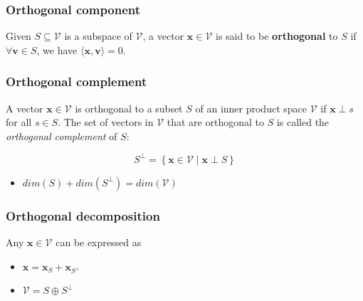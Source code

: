 \documentclass{article}
\begin{document}
        \subsubsection{Orthogonal component}
        \begin{definition}
            Given \( S \subseteq \mathcal{V} \) is a subspace of \( \mathcal{V} \), a vector \( \mathbf{x} \in \mathcal{V} \) is said to be \textbf{orthogonal} to \( S \) if \( \forall \mathbf{v} \in S \), we have \( \langle \mathbf{x}, \mathbf{v} \rangle = 0 \).
        \end{definition}

        \subsubsection{Orthogonal complement}
        \begin{definition}
            A vector $\mathbf{x} \in \mathcal{V}$ is orthogonal to a subset $S$ of an inner product space $\mathcal{V}$ if $\mathbf{x} \perp s$ for all $s \in S$. The set of vectors in $\mathcal{V}$ that are orthogonal to $S$ is called the \textit{orthogonal complement} of $S$:

            \begin{equation}
                S^\perp = \left\{ \mathbf{x} \in \mathcal{V} \mid \mathbf{x} \perp S \right\}
            \end{equation}
            \begin{itemize}
                \item $dim(S) + dim(S^\perp) = dim(\mathcal{V})$
            \end{itemize}
        \end{definition}


        \subsubsection{Orthogonal decomposition}
        \begin{definition}
            Any $\mathbf{x} \in \mathcal{V}$ can be expressed as 
            \begin{itemize}
                \item $\mathbf{x} = \mathbf{x}_S + \mathbf{x}_{S^\perp}$
                \item $\mathcal{V} = S \oplus S^\perp$
            \end{itemize}
        \end{definition}
\end{document}
